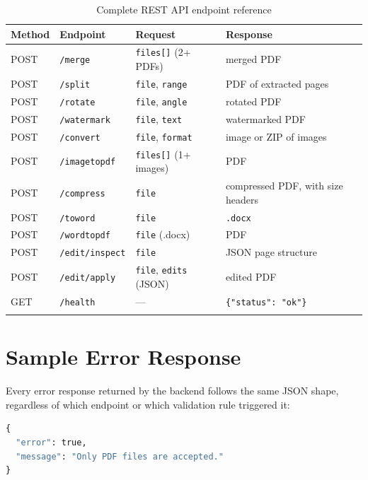 \documentclass[12pt,a4paper]{report}
\begin{document}
\begin{longtable}{@{}p{1.6cm}p{2.6cm}p{4.2cm}p{4.5cm}@{}}
\toprule
\textbf{Method} & \textbf{Endpoint} & \textbf{Request} & \textbf{Response} \\
\midrule
\endhead
POST & \texttt{/merge} & \texttt{files[]} (2+ PDFs) & merged PDF \\
POST & \texttt{/split} & \texttt{file}, \texttt{range} & PDF of extracted pages \\
POST & \texttt{/rotate} & \texttt{file}, \texttt{angle} & rotated PDF \\
POST & \texttt{/watermark} & \texttt{file}, \texttt{text} & watermarked PDF \\
POST & \texttt{/convert} & \texttt{file}, \texttt{format} & image or ZIP of images \\
POST & \texttt{/imagetopdf} & \texttt{files[]} (1+ images) & PDF \\
POST & \texttt{/compress} & \texttt{file} & compressed PDF, with size headers \\
POST & \texttt{/toword} & \texttt{file} & \texttt{.docx} \\
POST & \texttt{/wordtopdf} & \texttt{file} (.docx) & PDF \\
POST & \texttt{/edit/inspect} & \texttt{file} & JSON page structure \\
POST & \texttt{/edit/apply} & \texttt{file}, \texttt{edits} (JSON) & edited PDF \\
GET & \texttt{/health} & --- & \texttt{\{"status": "ok"\}} \\
\bottomrule
\caption{Complete REST API endpoint reference}
\label{tab:api}
\end{longtable}

\chapter{Sample Error Response}
Every error response returned by the backend follows the same JSON shape, regardless of which
endpoint or which validation rule triggered it:

\begin{lstlisting}[language=Python, caption={Uniform error response shape}]
{
  "error": true,
  "message": "Only PDF files are accepted."
}
\end{lstlisting}
\end{document}
